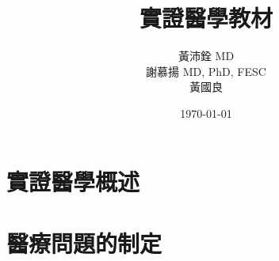 \documentclass[12pt,a4paper]{book}
\title{實證醫學教材}
\author{黃沛銓 MD\\謝慕揚 MD, PhD, FESC\\黃國良}
\date{\today}
\begin{document}
\maketitle

\tableofcontents

\chapter{實證醫學概述}



\chapter{醫療問題的制定}


% 
% 
\end{document}
